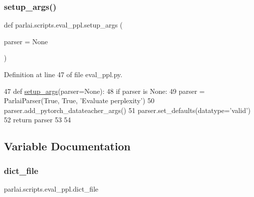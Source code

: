 \mbox{\label{namespaceparlai_1_1scripts_1_1eval__ppl_a4ae22cc04e19c46ed621afeba6e85d67}} 
\subsubsection{\texorpdfstring{setup\+\_\+args()}{setup\_args()}}
{\footnotesize\ttfamily def parlai.\+scripts.\+eval\+\_\+ppl.\+setup\+\_\+args (\begin{DoxyParamCaption}\item[{}]{parser = {\ttfamily None} }\end{DoxyParamCaption})}



Definition at line 47 of file eval\+\_\+ppl.\+py.


\begin{DoxyCode}
47 \textcolor{keyword}{def }\hyperlink{namespaceprojects_1_1convai2_1_1eval__ppl_ac83f1cd52a81f455fc2e726d76e1100e}{setup\_args}(parser=None):
48     \textcolor{keywordflow}{if} parser \textcolor{keywordflow}{is} \textcolor{keywordtype}{None}:
49         parser = ParlaiParser(\textcolor{keyword}{True}, \textcolor{keyword}{True}, \textcolor{stringliteral}{'Evaluate perplexity'})
50     parser.add\_pytorch\_datateacher\_args()
51     parser.set\_defaults(datatype=\textcolor{stringliteral}{'valid'})
52     \textcolor{keywordflow}{return} parser
53 
54 
\end{DoxyCode}


\subsection{Variable Documentation}
\mbox{\label{namespaceparlai_1_1scripts_1_1eval__ppl_a9f9177d01476851d8e9923f2c624fd4e}} 
\subsubsection{\texorpdfstring{dict\+\_\+file}{dict\_file}}
{\footnotesize\ttfamily parlai.\+scripts.\+eval\+\_\+ppl.\+dict\+\_\+file}



